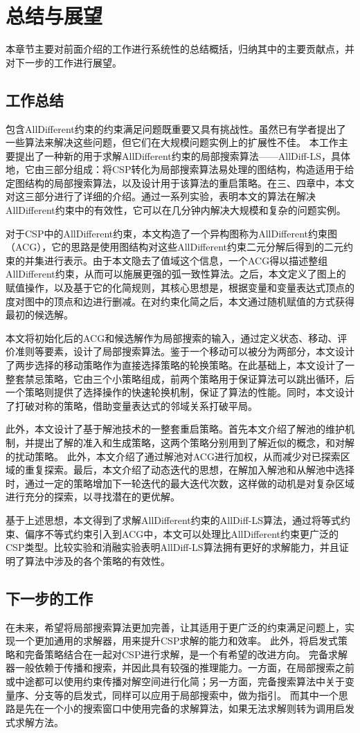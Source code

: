\chapter{总结与展望}\label{chap:method}

本章节主要对前面介绍的工作进行系统性的总结概括，归纳其中的主要贡献点，并对下一步的工作进行展望。

\section{工作总结}

包含AllDifferent约束的约束满足问题既重要又具有挑战性。虽然已有学者提出了一些算法来解决这些问题，但它们在大规模问题实例上的扩展性不佳。
本工作主要提出了一种新的用于求解AllDifferent约束的局部搜索算法——AllDiff-LS，具体地，它由三部分组成：将CSP转化为局部搜索算法易处理的图结构，构造适用于给定图结构的局部搜索算法，以及设计用于该算法的重启策略。在三、四章中，本文对这三部分进行了详细的介绍。通过一系列实验，表明本文的算法在解决AllDifferent约束中的有效性，它可以在几分钟内解决大规模和复杂的问题实例。

对于CSP中的AllDifferent约束，本文构造了一个异构图称为AllDifferent约束图（ACG），它的思路是使用图结构对这些AllDifferent约束二元分解后得到的二元约束的并集进行表示。由于本文隐去了值域这个信息，一个ACG得以描述整组AllDifferent约束，从而可以施展更强的弧一致性算法。之后，本文定义了图上的赋值操作，以及基于它的化简规则，其核心思想是，根据变量和变量表达式顶点的度对图中的顶点和边进行删减。在对约束化简之后，本文通过随机赋值的方式获得最初的候选解。

本文将初始化后的ACG和候选解作为局部搜索的输入，通过定义状态、移动、评价准则等要素，设计了局部搜索算法。鉴于一个移动可以被分为两部分，本文设计了两步选择的移动策略作为直接选择策略的轮换策略。在此基础上，本文设计了一整套禁忌策略，它由三个小策略组成，前两个策略用于保证算法可以跳出循环，后一个策略则提供了选择操作的快速轮换机制，保证了算法的性能。同时，本文设计了打破对称的策略，借助变量表达式的邻域关系打破平局。

此外，本文设计了基于解池技术的一整套重启策略。首先本文介绍了解池的维护机制，并提出了解的准入和生成策略，这两个策略分别用到了解近似的概念，和对解的扰动策略。
此外，本文介绍了通过解池对ACG进行加权，从而减少对已探索区域的重复探索。最后，本文介绍了动态迭代的思想，在解加入解池和从解池中选择时，通过一定的策略增加下一轮迭代的最大迭代次数，这样做的动机是对复杂区域进行充分的探索，以寻找潜在的更优解。

基于上述思想，本文得到了求解AllDifferent约束的AllDiff-LS算法，通过将等式约束、偏序不等式约束引入到ACG中，本文可以处理比AllDifferent约束更广泛的CSP类型。比较实验和消融实验表明AllDiff-LS算法拥有更好的求解能力，并且证明了算法中涉及的各个策略的有效性。

\section{下一步的工作}

在未来，希望将局部搜索算法更加完善，让其适用于更广泛的约束满足问题上，实现一个更加通用的求解器，用来提升CSP求解的能力和效率。
此外，将启发式策略和完备策略结合在一起对CSP进行求解，是一个有希望的改进方向。
完备求解器一般依赖于传播和搜索，并因此具有较强的推理能力。一方面，在局部搜索之前或中途都可以使用约束传播对解空间进行化简；另一方面，完备搜索算法中关于变量序、分支等的启发式，同样可以应用于局部搜索中，做为指引。
而其中一个思路是先在一个小的搜索窗口中使用完备的求解算法，如果无法求解则转为调用启发式求解方法。

\clearpage